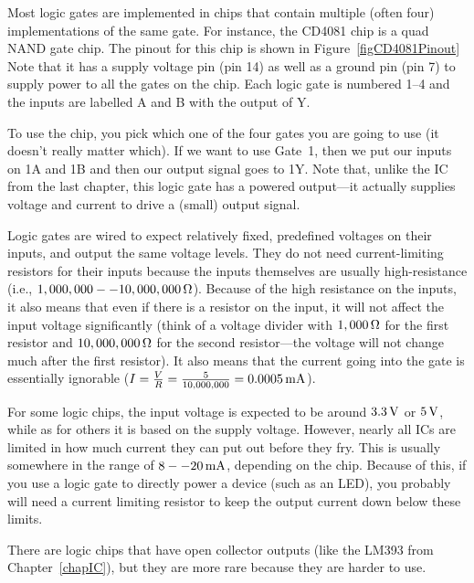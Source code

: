 
Most logic gates are implemented in chips that contain multiple (often four) implementations of the same gate.
For instance, the CD4081 chip is a quad NAND gate chip.
The pinout for this chip is shown in Figure~\ref{figCD4081Pinout}
Note that it has a supply voltage pin (pin 14) as well as a ground pin (pin 7) to supply power to all the gates on the chip.
Each logic gate is numbered 1--4 and the inputs are labelled A and B with the output of Y.

To use the chip, you pick which one of the four gates you are going to use (it doesn't really matter which).
If we want to use Gate~1, then we put our inputs on 1A and 1B and then our output signal goes to 1Y.
Note that, unlike the IC from the last chapter, this logic gate has a powered output---it actually supplies voltage and current to drive a (small) output signal.

Logic gates are wired to expect relatively fixed, predefined voltages on their inputs, and output the same voltage levels.
They do not need current-limiting resistors for their inputs because the inputs themselves are usually high-resistance (i.e., $1,000,000--10,000,000\,\si{\ohm}$).
Because of the high resistance on the inputs, it also means that even if there is a resistor on the input, it will not affect the input voltage significantly (think of a voltage divider with $1,000\,\si{\ohm}$ for the first resistor and $10,000,000\,\si{\ohm}$ for the second resistor---the voltage will not change much after the first resistor).
It also means that the current going into the gate is essentially ignorable ($I = \frac{V}{R} = \frac{5}{10,000,000} = 0.0005\,\si{\milli\ampere}$).

For some logic chips, the input voltage is expected to be around $3.3\,\si{\volt}$ or $5\,\si{\volt}$, while as for others it is based on the supply voltage.
However, nearly all ICs are limited in how much current they can put out before they fry.  
This is usually somewhere in the range of $8--20\,\si{\milli\ampere}$, depending on the chip.
Because of this, if you use a logic gate to directly power a device (such as an LED), you probably will need a current limiting resistor to keep the output current down below these limits.

There are logic chips that have open collector outputs (like the LM393 from Chapter~\ref{chapIC}), but they are more rare because they are harder to use.


